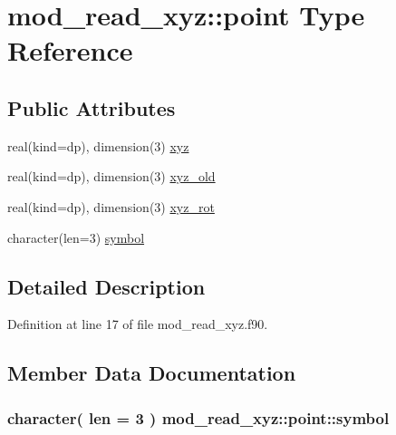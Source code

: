 \hypertarget{structmod__read__xyz_1_1point}{}\section{mod\+\_\+read\+\_\+xyz\+:\+:point Type Reference}
\label{structmod__read__xyz_1_1point}
\subsection*{Public Attributes}
\begin{DoxyCompactItemize}
\item 
real(kind=dp), dimension(3) \hyperlink{structmod__read__xyz_1_1point_a0f0abb4553673dd53beed006d23e8044}{xyz}
\item 
real(kind=dp), dimension(3) \hyperlink{structmod__read__xyz_1_1point_a850b0992c9c67aa0ab7f0cc5ce6e06a4}{xyz\+\_\+old}
\item 
real(kind=dp), dimension(3) \hyperlink{structmod__read__xyz_1_1point_a8065dc01a4172608ef691b470ad6b781}{xyz\+\_\+rot}
\item 
character(len=3) \hyperlink{structmod__read__xyz_1_1point_a95b7d7fa3c68486c2ea9537fdfd74fb7}{symbol}
\end{DoxyCompactItemize}


\subsection{Detailed Description}


Definition at line 17 of file mod\+\_\+read\+\_\+xyz.\+f90.



\subsection{Member Data Documentation}
\subsubsection[{\texorpdfstring{symbol}{symbol}}]{\setlength{\rightskip}{0pt plus 5cm}character( len = 3 ) mod\+\_\+read\+\_\+xyz\+::point\+::symbol}\hypertarget{structmod__read__xyz_1_1point_a95b7d7fa3c68486c2ea9537fdfd74fb7}{}\label{structmod__read__xyz_1_1point_a95b7d7fa3c68486c2ea9537fdfd74fb7}



